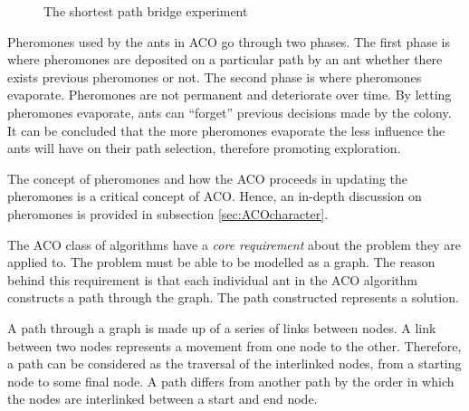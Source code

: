 \begin{figure}[H]
	\centering
	\setlength \fboxsep{0pt}
	\setlength \fboxrule{0.5pt}
	\caption{The shortest path bridge experiment \cite{AntsAndStigmergy}}
	\label{fig:antBridgeExperiment}
\end{figure}

Pheromones used by the ants in \gls{ACO} go through two phases. The first phase is where pheromones are deposited on a particular path by an ant whether there exists previous pheromones or not. The second phase is where pheromones evaporate. Pheromones are not permanent and deteriorate over time\cite{FundamentalSwarm}. By letting pheromones evaporate, ants can ``forget'' previous decisions made by the colony\cite{FundamentalSwarm}. It can be concluded that the more pheromones evaporate the less influence the ants will have on their path selection, therefore promoting exploration\cite{FundamentalSwarm}.

The concept of pheromones and how the \gls{ACO} proceeds in updating the pheromones is a critical concept of \gls{ACO}. Hence, an in-depth discussion on pheromones is provided in subsection \ref{sec:ACOcharacter}.

The \gls{ACO} class of algorithms have a \emph{core requirement} about the problem they are applied to\cite{FundamentalSwarm}. The problem must be able to be modelled as a graph. The reason behind this requirement is that each individual ant in the \gls{ACO} algorithm constructs a path through the graph\cite{FundamentalSwarm}. The path constructed represents a solution.

A path through a graph is made up of a series of links between nodes\cite{AIModernApproach,DataStructuresJava}. A link between two nodes represents a movement from one node to the other\cite{AIModernApproach,DataStructuresJava}. Therefore, a path can be considered as the traversal of the interlinked nodes, from a starting node to some final node\cite{AIModernApproach,DataStructuresJava}. A path differs from another path by the order in which the nodes are interlinked between a start and end node\cite{AIModernApproach,DataStructuresJava}.

